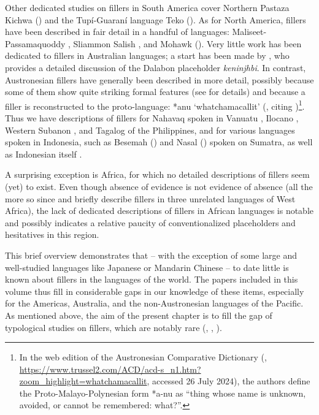 \documentclass[output=paper]{langscibook}
\begin{document}
Other dedicated studies on fillers in South America cover Northern Pastaza Kichwa (\citealt{chapters/rice}) and the Tupí-Guaraní language Teko (\citealt{chapters/rose}). As for North America, fillers have been described in fair detail in a handful of languages: Maliseet\hyp Passamaquoddy \citep{LeSourd2003}, Sliammon Salish \citep{Watanabe2010}, and Mohawk (\citealt{chapters/mithun}). Very little work has been dedicated to fillers in Australian languages; a start has been made by \citet{chapters/ponsonnet}, who provides a detailed discussion of the Dalabon placeholder \textit{keninjhbi}. In contrast, Austronesian fillers have generally  been described in more detail, possibly because some of them show quite striking formal features (see  for details) and because a filler is reconstructed to the proto-language: *anu ‘whatchamacallit’ (\citealt[92]{Nagaya2022}, citing \citealt{BlustAustronesian2013})\footnote{In the web edition of the Austronesian Comparative Dictionary (\citealt{BlustTrussel2013}, \url{https://www.trussel2.com/ACD/acd-s_n1.htm?zoom_highlight=whatchamacallit}, accessed 26 July 2024), the authors define the Proto-Malayo-Polynesian form *a-nu as “thing whose name is unknown, avoided, or cannot be remembered: what?”.\label{footnote:rosepakendorf:4}}. Thus we have descriptions of fillers for Nahavaq spoken in Vanuatu \citep{Dimock2010}, Ilocano \citep{Rubino1996}, Western Subanon \citep{Blake2020}, and Tagalog \citep{Nagaya2022} of the Philippines, and for various languages spoken in Indonesia, such as Besemah (\citealt{chapters/mcdonnell_billings}) and Nasal (\citealt{chapters/billings_mcdonnell}) spoken on Sumatra, as well as Indonesian itself \citep{Wouk2005}. 

A surprising exception is Africa, for which no detailed descriptions of fillers seem (yet) to exist. Even though absence of evidence is not evidence of absence (all the more so since \citealt{Heath1999, Heath2008} and \citealt{Heath2021} briefly describe fillers in three unrelated languages of West Africa), the lack of dedicated descriptions of fillers in African languages is notable and possibly indicates a relative paucity of conventionalized placeholders and hesitatives in this region.

This brief overview demonstrates that – with the exception of some large and well-studied languages like Japanese or Mandarin Chinese – to date little is known about fillers in the languages of the world. The papers included in this volume thus fill in considerable gaps in our knowledge of these items, especially for the Americas, Australia, and the non-Austronesian languages of the Pacific. As mentioned above, the aim of the present chapter is to fill the gap of typological studies on fillers, which are notably rare (\citealt{Hayashi2006}, \citealt{Podlesskaya2010}, \citealt{Seraku2024}).
\end{document}
